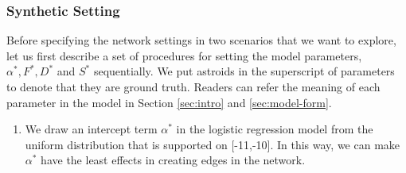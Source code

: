 \documentclass[AMS,STIX1COL]{WileyNJD-v2}
\begin{document}
{\subsubsection{Synthetic Setting} \label{sec:Syn-set}
Before specifying the network settings in two scenarios that we want to explore, let us first describe a set of procedures for setting the model parameters, $\alpha^*, F^*, D^*$ and $S^*$ sequentially.
We put astroids in the superscript of parameters to denote that they are ground truth.
Readers can refer the meaning of each parameter in the model in Section \ref{sec:intro} and  \ref{sec:model-form}.

\begin{enumerate}
    \item We draw an intercept term $\alpha^*$ in the logistic regression model from the uniform distribution that is supported on [-11,-10].
        In this way, we can make $\alpha^*$ have the least effects in creating edges in the network.


\end{enumerate}}
\end{document}
